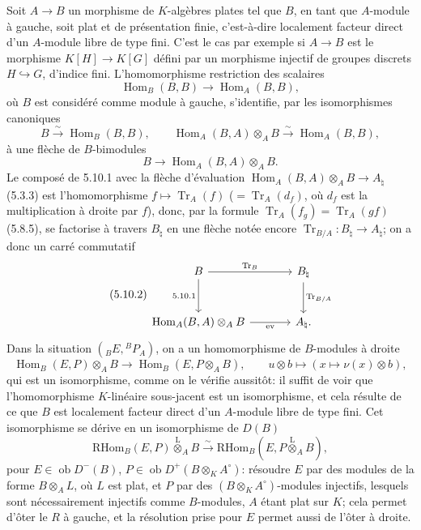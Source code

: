 \documentclass[11pt]{article}
\DeclareMathOperator{\Hom}{Hom}
\newcommand{\ob}{\operatorname{ob}}
\providecommand{\RHom}{\mathrm{RHom}}
\providecommand{\Tr}{\operatorname{Tr}}
\providecommand{\Tr}{\operatorname{Tr}}
\providecommand{\lten}{\overset{\mathrm L}{\otimes}}
\providecommand{\Tr}{\operatorname{Tr}}
\providecommand{\RHom}{\mathrm{RHom}}
\providecommand{\Hom}{\operatorname{Hom}}
\providecommand{\ob}{\operatorname{ob}}
\providecommand{\lten}{\overset{\mathrm L}{\otimes}}
\providecommand{\RHom}{\mathrm R\mathcal{H}om}
\providecommand{\lten}{\overset{\mathrm L}{\otimes}}
\providecommand{\Tr}{\operatorname{Tr}}
\providecommand{\lten}{\overset{\mathrm L}{\otimes}}
\providecommand{\lten}{\overset{\mathrm L}{\otimes}}
\providecommand{\lten}{\overset{\mathrm L}{\otimes}}
\providecommand{\RHom}{\mathrm{RHom}}
\providecommand{\Hom}{\operatorname{Hom}}
\providecommand{\Tr}{\operatorname{Tr}}
\providecommand{\lten}{\overset{\mathrm L}{\otimes}}
\begin{document}
Soit $A\to B$ un morphisme de $K$-algèbres plates tel que $B$, en tant que $A$-module à gauche, soit plat et de présentation finie, c'est-à-dire localement facteur direct d'un $A$-module libre de type fini. C'est le cas par exemple si $A\to B$ est le morphisme $K[H]\to K[G]$ défini par un morphisme injectif de groupes discrets $H\hookrightarrow G$, d'indice fini. L'homomorphisme restriction des scalaires
\[
\Hom_B(B,B)\longrightarrow\Hom_A(B,B),
\]
où $B$ est considéré comme module à gauche, s'identifie, par les isomorphismes canoniques
\[
B\xrightarrow{\sim}\Hom_B(B,B),\qquad \Hom_A(B,A)\otimes_AB\xrightarrow{\sim}\Hom_A(B,B),
\]
à une flèche de $B$-bimodules
\begin{equation}\tag{5.10.1}
B\longrightarrow\Hom_A(B,A)\otimes_AB.
\end{equation}
Le composé de 5.10.1 avec la flèche d'évaluation $\Hom_A(B,A)\otimes_AB\to A_\natural$ (5.3.3) est l'homomorphisme $f\mapsto\Tr_A(f)$ ($=\Tr_A(d_f)$, où $d_f$ est la multiplication à droite par $f$), donc, par la formule $\Tr_A(f_g)=\Tr_A(gf)$ (5.8.5), se factorise à travers $B_\natural$ en une flèche notée encore $\Tr_{B/A}:B_\natural\to A_\natural$; on a donc un carré commutatif
\begin{equation}\tag{5.10.2}
\begin{tikzcd}[column sep=large,row sep=large]
B \arrow[r,"\Tr_B"] \arrow[d,"5.10.1"'] & B_\natural \arrow[d,"\Tr_{B/A}"]\\
\Hom_A(B,A)\otimes_AB \arrow[r,"\mathrm{ev}"'] & A_\natural .
\end{tikzcd}
\end{equation}
Dans la situation $({}_BE,{}^BP_A)$, on a un homomorphisme de $B$-modules à droite
\begin{equation}\tag{5.10.3}
\Hom_B(E,P)\otimes_AB\longrightarrow\Hom_B(E,P\otimes_AB),\qquad
u\otimes b\longmapsto(x\longmapsto\nu(x)\otimes b),
\end{equation}
qui est un isomorphisme, comme on le vérifie aussitôt: il suffit de voir que l'homomorphisme $K$-linéaire sous-jacent est un isomorphisme, et cela résulte de ce que $B$ est localement facteur direct d'un $A$-module libre de type fini. Cet isomorphisme se dérive en un isomorphisme de $D(B)$
\begin{equation}\tag{5.10.4}
\RHom_B(E,P)\lten_AB\xrightarrow{\sim}\RHom_B(E,P\lten_AB),
\end{equation}
pour $E\in\ob D^-(B)$, $P\in\ob D^+(B\otimes_KA^\circ)$: résoudre $E$ par des modules de la forme $B\otimes_AL$, où $L$ est plat, et $P$ par des $(B\otimes_KA^\circ)$-modules injectifs, lesquels sont nécessairement injectifs comme $B$-modules, $A$ étant plat sur $K$; cela permet d'ôter le $R$ à gauche, et la résolution prise pour $E$ permet aussi de l'ôter à droite.
\end{document}
